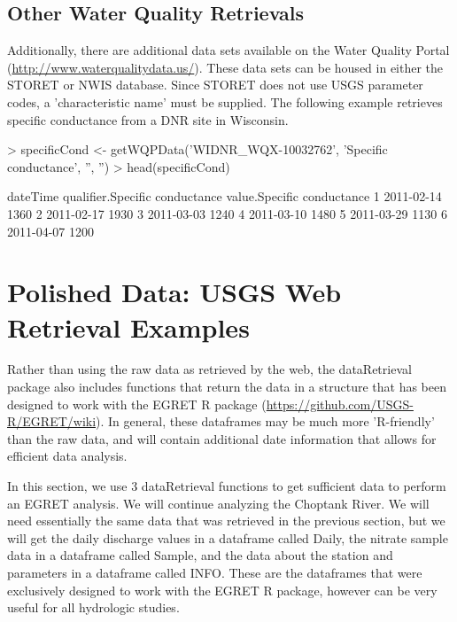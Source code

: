 \documentclass[a4paper,11pt]{article}
\begin{document}
\subsection{Other Water Quality Retrievals}
\label{sec:usgsSTORET}
Additionally, there are additional data sets available on the Water Quality Portal (\url{http://www.waterqualitydata.us/}).  These data sets can be housed in either the STORET or NWIS database.  Since STORET does not use USGS parameter codes, a 'characteristic name' must be supplied.  The following example retrieves specific conductance from a DNR site in Wisconsin.

\begin{Schunk}
\begin{Sinput}
> specificCond <- getWQPData('WIDNR_WQX-10032762', 
         'Specific conductance', '', '')
> head(specificCond)
\end{Sinput}
\begin{Soutput}
    dateTime qualifier.Specific conductance value.Specific conductance
1 2011-02-14                                                      1360
2 2011-02-17                                                      1930
3 2011-03-03                                                      1240
4 2011-03-10                                                      1480
5 2011-03-29                                                      1130
6 2011-04-07                                                      1200
\end{Soutput}
\end{Schunk}


\section{Polished Data: USGS Web Retrieval Examples}
Rather than using the raw data as retrieved by the web, the dataRetrieval package also includes functions that return the data in a structure that has been designed to work with the EGRET R package (\url{https://github.com/USGS-R/EGRET/wiki}). In general, these dataframes may be much more 'R-friendly' than the raw data, and will contain additional date information that allows for efficient data analysis.

In this section, we use 3 dataRetrieval functions to get sufficient data to perform an EGRET analysis.  We will continue analyzing the Choptank River. We will need essentially the same data that was retrieved in the previous section, but we will get the daily discharge values in a dataframe called Daily, the nitrate sample data in a dataframe called Sample, and the data about the station and parameters in a dataframe called INFO. These are the dataframes that were exclusively designed to work with the EGRET R package, however can be very useful for all hydrologic studies.
\end{document}
